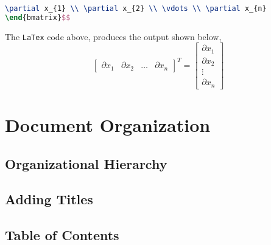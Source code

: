 \documentclass[a4paper, 12pt]{report}
\begin{document}
\begin{center}
\begin{lstlisting}[language=tex]
\partial x_{1} \\ \partial x_{2} \\ \vdots \\ \partial x_{n}
\end{bmatrix}$$
\end{lstlisting}
The \texttt{LaTex} code above, produces the output shown below,
$$\begin{bmatrix}
\partial x_{1} & \partial x_{2} & \dots & \partial x_{n}
\end{bmatrix}^{T} = \begin{bmatrix}
\partial x_{1} \\ \partial x_{2} \\ \vdots \\ \partial x_{n}
\end{bmatrix}$$

\section{Document Organization}
\begin{comment}

\begin{lstlisting}[language=tex]
\end{lstlisting}
The \texttt{LaTex} code above, produces the output shown below,

\end{comment}

\subsection{Organizational Hierarchy}
\begin{comment}
\end{comment}

\subsection{Adding Titles}
\begin{comment}
\end{comment}

\subsection{Table of Contents}
\begin{comment}
\end{comment}


\end{center}
\end{document}
